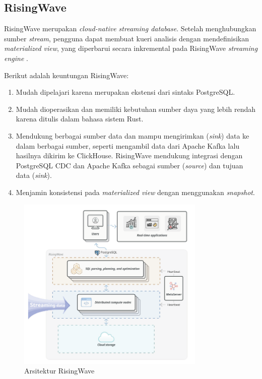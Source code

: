 \subsection{RisingWave}

RisingWave merupakan \textit{cloud-native streaming database}. Setelah menghubungkan sumber \textit{stream}, pengguna dapat membuat kueri analisis dengan mendefinisikan \textit{materialized view}, yang diperbarui secara inkremental pada RisingWave \textit{streaming engine} \parencite{risingwave}.

Berikut adalah keuntungan RisingWave:

\begin{enumerate}
    \item Mudah dipelajari karena merupakan ekstensi dari sintaks PostgreSQL.
    \item Mudah dioperasikan dan memiliki kebutuhan sumber daya yang lebih rendah karena ditulis dalam bahasa sistem Rust.
    \item Mendukung berbagai sumber data dan mampu mengirimkan (\textit{sink}) data ke dalam berbagai sumber, seperti mengambil data dari Apache Kafka lalu hasilnya dikirim ke ClickHouse. RisingWave mendukung integrasi dengan PostgreSQL CDC dan Apache Kafka sebagai sumber (\textit{source}) dan tujuan data (\textit{sink}).
    \item Menjamin konsistensi pada \textit{materialized view} dengan menggunakan \textit{snapshot}.
\end{enumerate}

\begin{figure}[ht]
    \centering
    \includegraphics[width=0.8\textwidth]{resources/chapter-2/risingwave.png}
    \caption{Arsitektur RisingWave \parencite{risingwave}}
    \label{fig:risingwave-architecture}
\end{figure}

